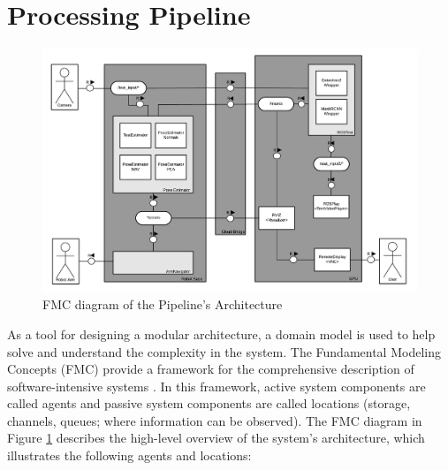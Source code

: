 \section{Processing Pipeline}\label{chap:3:architecture}
\begin{figure}[!ht]
        \centering
        \includegraphics[width=.9\textwidth]{images/cow_fmc.png}
        \caption{FMC diagram of the Pipeline's Architecture}
        \label{fig:cow_fmc}
    \end{figure}
As a tool for designing a modular architecture, a domain model is used to help solve and understand the complexity in the system. The Fundamental Modeling Concepts (FMC) provide a framework for the comprehensive description of software-intensive systems \cite{FMCdiag}. 
In this framework, active system components are called agents and passive system components are called locations (storage, channels, queues; where information can be observed). The FMC diagram in Figure \ref{fig:cow_fmc} describes the high-level overview of the system's architecture, which illustrates the following agents and locations:
